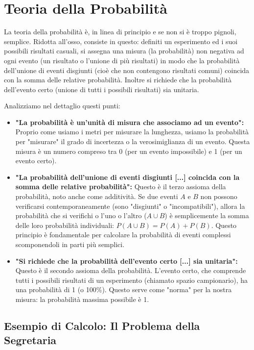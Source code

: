 \section{Teoria della Probabilità}

La teoria della probabilità è, in linea di principio e se non si è troppo pignoli, semplice. Ridotta all’osso, consiste in questo: definiti un esperimento ed i suoi possibili risultati casuali, si assegna una misura (la probabilità) non negativa ad ogni evento (un risultato o l’unione di più risultati) in modo che la probabilità dell'unione di eventi disgiunti (cioè che non contengono risultati comuni) coincida con la somma delle relative probabilità. Inoltre si richiede che la probabilità dell’evento certo (unione di tutti i possibili risultati) sia unitaria.

Analizziamo nel dettaglio questi punti:

\begin{itemize}
    \item \textbf{"La probabilità è un'unità di misura che associamo ad un evento":} Proprio come usiamo i metri per misurare la lunghezza, usiamo la probabilità per "misurare" il grado di incertezza o la verosimiglianza di un evento. Questa misura è un numero compreso tra 0 (per un evento impossibile) e 1 (per un evento certo).
    \item \textbf{"La probabilità dell'unione di eventi disgiunti [...] coincida con la somma delle relative probabilità":} Questo è il terzo assioma della probabilità, noto anche come additività. Se due eventi $A$ e $B$ non possono verificarsi contemporaneamente (sono "disgiunti" o "incompatibili"), allora la probabilità che si verifichi o l'uno o l'altro ($A \cup B$) è semplicemente la somma delle loro probabilità individuali: $P(A \cup B) = P(A) + P(B)$. Questo principio è fondamentale per calcolare la probabilità di eventi complessi scomponendoli in parti più semplici.
    \item \textbf{"Si richiede che la probabilità dell’evento certo [...] sia unitaria":} Questo è il secondo assioma della probabilità. L'evento certo, che comprende tutti i possibili risultati di un esperimento (chiamato spazio campionario), ha una probabilità di 1 (o 100\%). Questo serve come "norma" per la nostra misura: la probabilità massima possibile è 1.
\end{itemize}

\subsection{Esempio di Calcolo: Il Problema della Segretaria}

